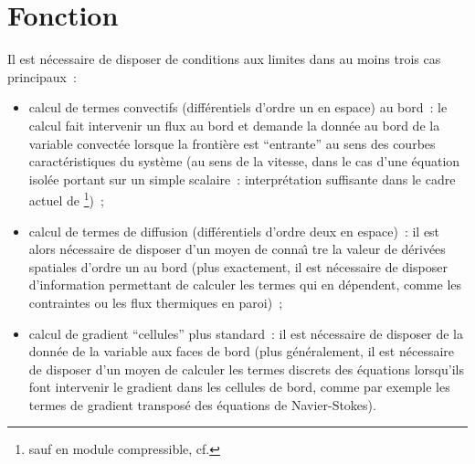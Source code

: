 %
%
%
%
%
%
%
%


\vspace{1cm}
\section{Fonction}
Il est n\'ecessaire de disposer de conditions aux limites dans au moins
trois cas principaux~:
\begin{itemize}
\item calcul de termes convectifs (diff\'erentiels d'ordre un en espace) au
bord~:  le calcul fait intervenir un flux au bord et demande
la donn\'ee au bord de la variable convect\'ee lorsque la fronti\`ere est
``entrante'' au sens des courbes caract\'eristiques du syst\`eme
(au sens de la vitesse, dans le cas d'une \'equation isol\'ee portant
sur un simple scalaire~: interpr\'etation suffisante dans le cadre actuel de
\CS\footnote{sauf en module compressible, cf. })~;
\item calcul de termes de diffusion (diff\'erentiels d'ordre deux en espace)~:
il est alors n\'ecessaire de disposer d'un moyen de conna\^\i
tre la valeur
de d\'eriv\'ees spatiales d'ordre un au bord (plus exactement, il est
n\'ecessaire de disposer d'information permettant de calculer les termes qui en
d\'ependent, comme les contraintes ou les flux thermiques en paroi)~;
\item calcul de gradient ``cellules'' plus standard~: il est n\'ecessaire de disposer de la
donn\'ee de la variable aux faces de bord (plus g\'en\'eralement, il est n\'ecessaire
de disposer d'un moyen de calculer les termes discrets des \'equations
lorsqu'ils font intervenir le gradient dans les cellules de bord, comme par
exemple les termes de gradient transpos\'e des \'equations de Navier-Stokes).
\end{itemize}


